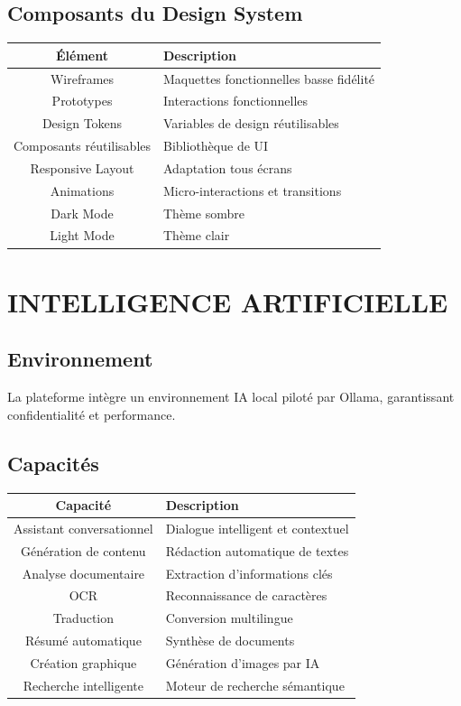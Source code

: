 \documentclass[12pt,a4paper,oneside]{book}
\begin{document}
\section{Composants du Design System}
\begin{center}
\begin{tabular}{|c|p{10cm}|}
\hline
\rowcolor{electronpurple}
\color{white}\textbf{Élément} & \color{white}\textbf{Description} \\
\hline
Wireframes & Maquettes fonctionnelles basse fidélité \\
\hline
Prototypes & Interactions fonctionnelles \\
\hline
Design Tokens & Variables de design réutilisables \\
\hline
Composants réutilisables & Bibliothèque de UI \\
\hline
Responsive Layout & Adaptation tous écrans \\
\hline
Animations & Micro-interactions et transitions \\
\hline
Dark Mode & Thème sombre \\
\hline
Light Mode & Thème clair \\
\hline
\end{tabular}
\end{center}

\chapter{INTELLIGENCE ARTIFICIELLE}

\section{Environnement}
La plateforme intègre un environnement IA local piloté par Ollama, garantissant confidentialité et performance.

\section{Capacités}
\begin{center}
\begin{tabular}{|c|p{10cm}|}
\hline
\rowcolor{electronblue}
\color{white}\textbf{Capacité} & \color{white}\textbf{Description} \\
\hline
Assistant conversationnel & Dialogue intelligent et contextuel \\
\hline
Génération de contenu & Rédaction automatique de textes \\
\hline
Analyse documentaire & Extraction d'informations clés \\
\hline
OCR & Reconnaissance de caractères \\
\hline
Traduction & Conversion multilingue \\
\hline
Résumé automatique & Synthèse de documents \\
\hline
Création graphique & Génération d'images par IA \\
\hline
Recherche intelligente & Moteur de recherche sémantique \\
\hline
\end{tabular}
\end{center}
\end{document}
